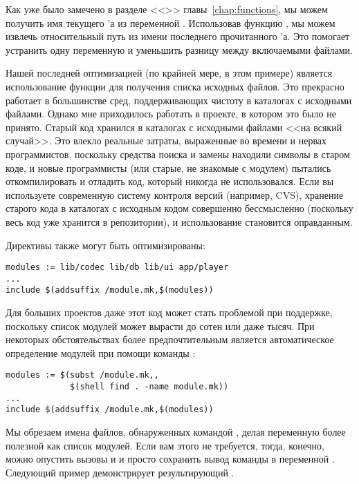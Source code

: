 Как уже было замечено в разделе <<>>
главы~\ref{chap:functions}, мы можем получить имя текущего
\Makefile{}'а из переменной . Использовав
функцию , мы можем извлечь относительный путь из
имени последнего прочитанного \Makefile{}'а. Это помогает устранить
одну переменную и уменьшить разницу между включаемыми файлами.

Нашей последней оптимизацией (по крайней мере, в этом примере)
является использование функции  для получения
списка исходных файлов. Это прекрасно работает в большинстве сред,
поддерживающих чистоту в каталогах с исходными файлами. Однако мне
приходилось работать в проекте, в котором это было не принято. Старый
код хранился в каталогах с исходными файлами <<на всякий случай>>.
Это влекло реальные затраты, выраженные во времени и нервах
программистов, поскольку средства поиска и замены находили символы в
старом коде, и новые программисты (или старые, не знакомые с модулем)
пытались откомпилировать и отладить код, который никогда не
использовался. Если вы используете современную систему контроля версий
(например, CVS), хранение старого кода в каталогах с исходным кодом
совершенно бессмысленно (поскольку весь код уже хранится в
репозитории), и использование  становится
оправданным.

Директивы  также могут быть оптимизированы:

{\footnotesize
\begin{verbatim}
modules := lib/codec lib/db lib/ui app/player
...
include $(addsuffix /module.mk,$(modules))
\end{verbatim}
}

Для больших проектов даже этот код может стать проблемой при
поддержке, поскольку список модулей может вырасти до сотен или даже
тысяч. При некоторых обстоятельствах более предпочтительным является
автоматическое определение модулей при помощи команды :

{\footnotesize
\begin{verbatim}
modules := $(subst /module.mk,,
             $(shell find . -name module.mk))
...
include $(addsuffix /module.mk,$(modules))
\end{verbatim}
}

Мы обрезаем имена файлов, обнаруженных командой , делая
переменную  более полезной как список модулей. Если
вам этого не требуется, тогда, конечно, можно опустить вызовы
 и  и просто сохранить вывод
команды  в переменной .  Следующий
пример демонстрирует результирующий \Makefile{}.

